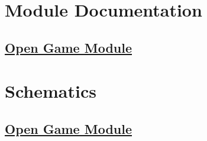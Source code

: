 \documentclass{article}
\begin{document}
  

  \section{Module Documentation}

  \subsection{\href{../files/open_game_module-v.html}{Open Game Module}}

  \section{Schematics}

  \subsection{\href{../../../schematic/open_game_module.pdf}{Open Game Module}}
\end{document}
